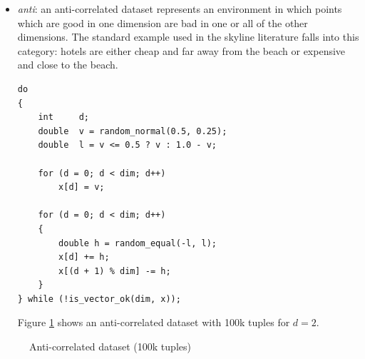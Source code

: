 \begin{itemize}
\item \emph{anti}:
an anti-correlated dataset represents an environment in which points
which are good in one dimension are bad in one or all of the other
dimensions. The standard example used in the skyline literature falls
into this category: hotels are either cheap and far away from the
beach or expensive and close to the beach.

\begin{lstlisting}
do
{
	int		d;
	double	v = random_normal(0.5, 0.25);
	double	l = v <= 0.5 ? v : 1.0 - v;
			
	for (d = 0; d < dim; d++)
		x[d] = v;
		
	for (d = 0; d < dim; d++)
	{
		double h = random_equal(-l, l);
		x[d] += h;
		x[(d + 1) % dim] -= h;
	}
} while (!is_vector_ok(dim, x));
\end{lstlisting}

Figure \ref{fig:density-2d-a2d1e5} shows an anti-correlated dataset
with 100k tuples for $d = 2$.
\end{itemize}

\begin{figure}[htbp]
\centering
{}%
%
\caption{Anti-correlated dataset (100k tuples)}%
\label{fig:density-2d-a2d1e5}%
\end{figure}

